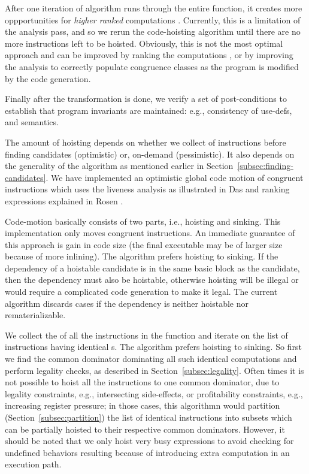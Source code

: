 \documentclass[acmlarge,review,anonymous]{acmart}\settopmatter{printfolios=true}
\begin{document}
After one iteration of algorithm runs through the entire function, it creates
more oppportunities for \emph{higher ranked} computations
\cite{rosen1988global}. Currently, this is a limitation of the \GVN{} analysis
pass, and so we rerun the code-hoisting algorithm until there are no more
instructions left to be hoisted.  Obviously, this is not the most optimal
approach and can be improved by ranking the computations \cite{rosen1988global},
or by improving the \GVN{} analysis to correctly populate congruence classes as
the program is modified by the code generation.

Finally after the transformation is done, we verify a set of post-conditions to
establish that program invariants are maintained: e.g., consistency of use-defs,
and \SSA{} semantics.

The amount of hoisting depends on whether we collect \GVN{} of instructions
before finding candidates (optimistic) or, on-demand (pessimistic). It also
depends on the generality of the \GVN{} algorithm as mentioned earlier in
Section~\ref{subsec:finding-candidates}. We have implemented an optimistic
global code motion of congruent instructions which uses the liveness analysis as
illustrated in Das \cite{das2012} and ranking expressions explained in Rosen
\cite{rosen1988global}.

Code-motion basically consists of two parts, i.e., hoisting and sinking. This
implementation only moves congruent instructions. An immediate guarantee of this
approach is gain in code size (the final executable may be of larger size
because of more inlining). The algorithm prefers hoisting to sinking. If the
dependency of a hoistable candidate is in the same basic block as the candidate,
then the dependency must also be hoistable, otherwise hoisting will be illegal or
would require a complicated code generation to make it legal. The current
algorithm discards cases if the dependency is neither hoistable nor
rematerializable.

We collect the \GVN{} of all the instructions in the function and iterate on the
list of instructions having identical \GVN{}s. The algorithm prefers hoisting to
sinking. So first we find the common dominator dominating all such identical
computations and perform legality checks, as described in
Section~\ref{subsec:legality}. Often times it is not possible to hoist all the
instructions to one common dominator, due to legality constraints, e.g.,
intersecting side-effects, or profitability constraints, e.g., increasing
register pressure; in those cases, this algorithmn would partition
(Section~\ref{subsec:partition}) the list of identical instructions into subsets
which can be partially hoisted to their respective common dominators. However,
it should be noted that we only hoist very busy expressions to avoid checking
for undefined behaviors resulting because of introducing extra computation in an
execution path.
\end{document}
